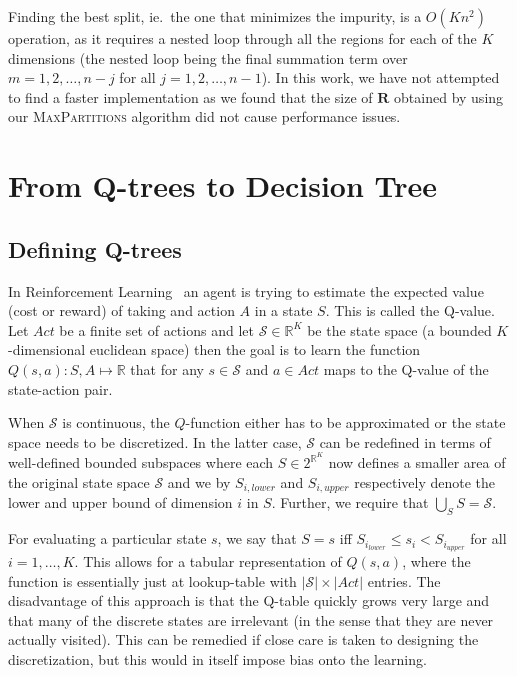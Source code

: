 Finding the best split, ie.\ the one that minimizes the impurity, is a $O(Kn^2)$
operation, as it requires a nested loop through all the regions for each
of the $K $dimensions (the nested loop being the final summation term over $m =
1, 2, \ldots, n - j$ for all $j = 1, 2, \ldots, n - 1$). In this work, we have
not attempted to find a faster implementation as we found that the size of
$\mathbf{R}$ obtained by using our \textsc{MaxPartitions} algorithm did not
cause performance issues.


\section{From Q-trees to Decision Tree}%
\label{sec:convergeToDT}

\subsection{Defining Q-trees}%
\label{subsec:defQTrees}

In Reinforcement Learning~\cite{Sutton1998} an agent is trying to estimate the
expected value (cost or reward) of taking and action $A$ in a state $S$. This is
called the Q-value. Let $Act$ be a finite set of actions and let $\mathcal{S}
\in \mathbb{R}^K$ be the state space (a bounded $K$-dimensional euclidean space)
then the goal is to learn the function $Q(s,a) : S, A \mapsto \mathbb{R}$ that
for any $s \in \mathcal{S}$ and $a \in Act$ maps to the Q-value of the
state-action pair.

When $\mathcal{S}$ is continuous, the $Q$-function either has to be approximated
or the state space needs to be discretized. In the latter case, $\mathcal{S}$
can be redefined in terms of well-defined bounded subspaces where each $S \in
2^{\mathbb{R}^{K}}$ now defines a smaller area of the original state space
$\mathcal{S}$ and we by $S_{i,lower}$ and $S_{i,upper}$ respectively denote the lower and
upper bound of dimension $i$ in $S$. Further, we require that $\bigcup_S S =
\mathcal{S}$.

For evaluating a particular state $s$, we say that $S = s$ iff $S_{i_{lower}}
\le s_i < S_{i_{upper}}$ for all $i = 1, \ldots, K$.  This allows for a tabular
representation of $Q(s,a)$, where the function is essentially just at
lookup-table with $|\mathcal{S}| \times |Act|$ entries. The disadvantage
of this approach is that the Q-table quickly grows very large and that many of
the discrete states are irrelevant (in the sense that they are never actually
visited). This can be remedied if close care is taken to designing the
discretization, but this would in itself impose bias onto the learning.

